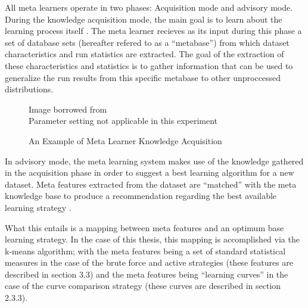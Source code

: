 All meta learners operate in two phases: Acquisition mode and advisory mode.
During the knowledge acquisition mode, the main goal is to learn about the
learning process itself \cite{Vilalta}. The meta learner recieves as its input
during this phase a set of database sets (hereafter refered to as a ``metabase'')
from which dataset characteristics and run statistics are extracted. The goal
of the extraction of these characteristics and statistics is to gather
information that can be used to generalize the run results from this specific
metabase to other unproccessed distributions.

\begin{figure}[h]
\caption{An Example of Meta Learner Knowledge Acquisition}
\centering
Image borrowed from \cite{Vilalta} \\
Parameter setting not applicable in this experiment
\end{figure}

In advisory mode, the meta learning system makes use of the knowledge gathered in
the acquisition phase in order to suggest a best learning algorithm for a new
dataset. Meta features extracted from the dataset are ``matched'' with the
meta knowledge base to produce a recommendation regarding the best available
learning strategy \cite{Vilalta}.

What this entails is a mapping between meta features and an optimum base learning
strategy. In the case of this thesis, this mapping is accomplished via the k-means
algorithm; with the meta features being a set of standard statistical measures
in the case of the brute force and active strategies (these features are described
in section 3.3) and the meta features being ``learning curves'' in the case of the
curve comparison strategy (these curves are described in section 2.3.3).

